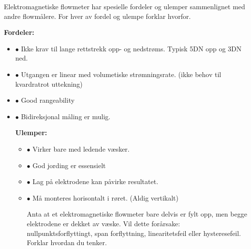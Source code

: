 

Elektromagnetiske flowmeter har spesielle fordeler og ulemper sammenlignet med andre flowmålere. For hver av fordel og ulempe forklar hvorfor. 
\vskip 10pt

{\bf Fordeler:}

\begin{itemize}
\item{$\bullet$} Ikke krav til lange rettstrekk opp- og nedstrøms. Typisk 5DN opp og 3DN ned. %
\item{$\bullet$} Utgangen er linear med volumetiske strømningsrate. (ikke behov til kvardratrot uttekning) %
\item{$\bullet$} Good rangeability
\item{$\bullet$} Bidireksjonal måling er mulig. %
\medskip

\vskip 10pt

{\bf Ulemper:}

\begin{itemize}
\item{$\bullet$} Virker bare med ledende v{\ae}sker. %
\item{$\bullet$} God jording er essensielt %
\item{$\bullet$} Lag på elektrodene kan påvirke resultatet. %
\item{$\bullet$} Må monteres horisontalt i røret. (Aldig vertikalt) %
\medskip

\vskip 10pt

Anta at et elektromagnetiske flowmeter bare delvis er fylt opp, men begge elektrodene er dekket av v{\ae}ske. Vil dette forårsake: nullpunktsforflyttingt, span forflyttning, linearitetsfeil eller hysteresefeil. Forklar hvordan du tenker.


\end{itemize}
\end{itemize}
